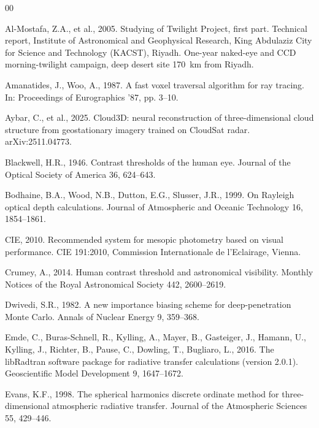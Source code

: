 \documentclass[preprint,12pt]{elsarticle}
\begin{document}

\begin{thebibliography}{00}

Al-Mostafa, Z.A., et al., 2005. Studying of Twilight Project, first
part. Technical report, Institute of Astronomical and Geophysical
Research, King Abdulaziz City for Science and Technology (KACST),
Riyadh. One-year naked-eye and CCD morning-twilight campaign, deep
desert site 170~km from Riyadh.

Amanatides, J., Woo, A., 1987. A fast voxel traversal algorithm for ray
tracing. In: Proceedings of Eurographics '87, pp. 3--10.

Aybar, C., et al., 2025. Cloud3D: neural reconstruction of
three-dimensional cloud structure from geostationary imagery trained on
CloudSat radar. arXiv:2511.04773.

Blackwell, H.R., 1946. Contrast thresholds of the human eye. Journal of
the Optical Society of America 36, 624--643.

Bodhaine, B.A., Wood, N.B., Dutton, E.G., Slusser, J.R., 1999. On
Rayleigh optical depth calculations. Journal of Atmospheric and Oceanic
Technology 16, 1854--1861.

CIE, 2010. Recommended system for mesopic photometry based on visual
performance. CIE 191:2010, Commission Internationale de l'Eclairage,
Vienna.

Crumey, A., 2014. Human contrast threshold and astronomical visibility.
Monthly Notices of the Royal Astronomical Society 442, 2600--2619.

Dwivedi, S.R., 1982. A new importance biasing scheme for deep-penetration
Monte Carlo. Annals of Nuclear Energy 9, 359--368.

Emde, C., Buras-Schnell, R., Kylling, A., Mayer, B., Gasteiger, J.,
Hamann, U., Kylling, J., Richter, B., Pause, C., Dowling, T.,
Bugliaro, L., 2016. The libRadtran software package for radiative
transfer calculations (version 2.0.1). Geoscientific Model Development 9,
1647--1672.

Evans, K.F., 1998. The spherical harmonics discrete ordinate method for
three-dimensional atmospheric radiative transfer. Journal of the
Atmospheric Sciences 55, 429--446.


\end{thebibliography}
\end{document}
